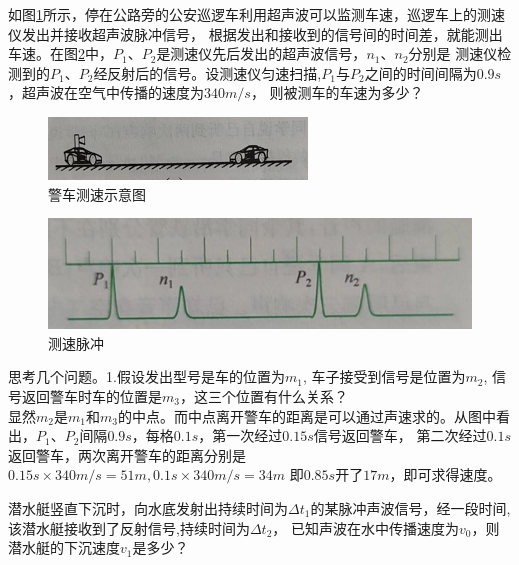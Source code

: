 \documentclass[windows,csize4, answers]{BHCexam}
\begin{document}
\begin{groups}
\begin{questions}[]
        \question[5] 如图\ref{fig:fig_2_7}所示，停在公路旁的公安巡逻车利用超声波可以监测车速，巡逻车上的测速仪发出并接收超声波脉冲信号，
        根据发出和接收到的信号间的时间差，就能测出车速。在图\ref{fig:fig_2_8}中，$P_1$、$P_2$是测速仪先后发出的超声波信号，$n_1$、$n_2$分别是
        测速仪检测到的$P_1$、$P_2$经反射后的信号。设测速仪匀速扫描,$P_1$与$P_2$之间的时间间隔为$0.9s$，超声波在空气中传播的速度为$340m/s$，
        则被测车的车速为多少？
        \begin{figure}[htb]
            \centering
            \includegraphics [scale=0.75,trim=0 0 0 0]{./image/fig_2_7.PNG}
            \caption{警车测速示意图}
            \label{fig:fig_2_7}
        \end{figure}
        \begin{figure}[htb]
            \centering
            \includegraphics [scale=0.75,trim=0 0 0 0]{./image/fig_2_8.PNG}
            \caption{测速脉冲}
            \label{fig:fig_2_8}
        \end{figure}
        \begin{solution}{0.5cm}
            \methodonly 思考几个问题。1.假设发出型号是车的位置为$m_1$, 车子接受到信号是位置为$m_2$, 信号返回警车时车的位置是$m_3$，这三个位置有什么关系？\\
            显然$m_2$是$m_1$和$m_3$的中点。而中点离开警车的距离是可以通过声速求的。从图中看出，$P_1$、$P_2$间隔$0.9s$，每格$0.1s$，第一次经过$0.15s$信号返回警车，
            第二次经过$0.1s$返回警车，两次离开警车的距离分别是$0.15s\times 340m/s=51m,0.1s\times 340m/s=34m$ 即$0.85s$开了$17m$，即可求得速度。
        \end{solution}


    \end{questions}

    \begin{questions}[]
        \question[5] 潜水艇竖直下沉时，向水底发射出持续时间为$\Delta t_1$的某脉冲声波信号，经一段时间,该潜水艇接收到了反射信号,持续时间为$\Delta t_2$，
        已知声波在水中传播速度为$v_0$，则潜水艇的下沉速度$v_1$是多少？


\end{questions}
\end{groups}
\end{document}
